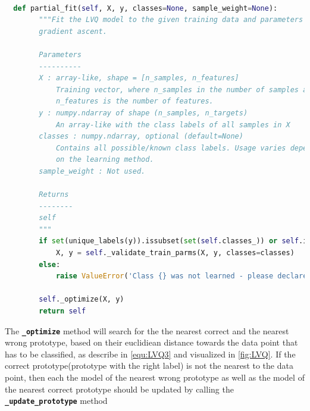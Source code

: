 \documentclass[12pt,oneside,a4paper,parskip]{scrbook}
\begin{document}
\begin{lstlisting}[label=lst:partialfit,
  language=python,
  firstnumber=1,
  caption=Method \texttt{partial\_fit} from the scikit-multiflow framework]			   

  def partial_fit(self, X, y, classes=None, sample_weight=None):
        """Fit the LVQ model to the given training data and parameters using
        gradient ascent.

        Parameters
        ----------
        X : array-like, shape = [n_samples, n_features]
            Training vector, where n_samples in the number of samples and
            n_features is the number of features.
        y : numpy.ndarray of shape (n_samples, n_targets)
            An array-like with the class labels of all samples in X
        classes : numpy.ndarray, optional (default=None)
            Contains all possible/known class labels. Usage varies depending
            on the learning method.
        sample_weight : Not used.

        Returns
        --------
        self
        """
        if set(unique_labels(y)).issubset(set(self.classes_)) or self.initial_fit is True:
            X, y = self._validate_train_parms(X, y, classes=classes)
        else:
            raise ValueError('Class {} was not learned - please declare all classes in first call of fit/partial_fit'.format(y))

        self._optimize(X, y)
        return self
\end{lstlisting}

The \textbf{\texttt{\_optimize}} method will search for the the nearest correct and the nearest wrong prototype, based on 
their euclidiean distance towards the data point that has to be classified, as describe in \ref{equ:LVQ3} and visualized in \ref{fig:LVQ}.
If the correct prototype(prototype with the right label) is not the nearest to the data point, then each the model of the nearest wrong
prototype as well as the model of the nearest correct prototype should be updated by calling the \textbf{\texttt{\_update\_prototype}} method
\end{document}
